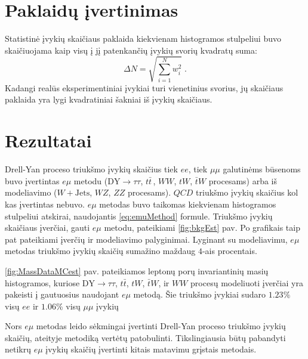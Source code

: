 \documentclass[a4paper, 12pt]{article}
\newcommand{\tbarW}{\bar{t}W}
\newcommand{\ttbar}{t\bar{t}}
\newcommand{\emu}{e\mu}
\newcommand{\mumu}{\mu\mu}
\newcommand{\DYtau}{\mathrm{DY} \! \rightarrow \! \tau\tau}
\newlength\q
\begin{document}
\section{Paklaidų įvertinimas}\label{sec:uncertainties}

Statistinė įvykių skaičiaus paklaida kiekvienam histogramos stulpeliui buvo skaičiuojama kaip visų
į jį patenkančių įvykių svorių kvadratų suma:
\begin{equation}
	\Delta N = \sqrt{\sum_{i=1}^{N}w_{i}^{2}} \; .
	\label{eq:Sumw2Unc}
\end{equation}
Kadangi realūs eksperimentiniai įvykiai turi vienetinius svorius, jų skaičiaus paklaida yra lygi
kvadratiniai šakniai iš įvykių skaičiaus.


\section{Rezultatai}

Drell-Yan proceso triukšmo įvykių skaičius tiek $ee$, tiek $\mumu$ galutinėms būsenoms buvo įvertintas $\emu$
metodu ($\DYtau$, $t\bar{t}\,$, $WW$, $tW$, $\bar{t}W$ procesams) arba iš modeliavimo ($W+\mathrm{Jets}$, $WZ$,
$ZZ$ procesams).
$QCD$ triukšmo įvykių skaičius kol kas įvertintas nebuvo.
$\emu$ metodas buvo taikomas kiekvienam histogramos stulpeliui atskirai, naudojantis \eqref{eq:emuMethod} formule.
Triukšmo įvykių skaičiaus įverčiai, gauti $\emu$ metodu, pateikiami \ref{fig:bkgEst} pav.
Po grafikais taip pat pateikiami įverčių ir modeliavimo palyginimai.
Lyginant su modeliavimu, $\emu$ metodas triukšmo įvykių skaičių sumažino maždaug $4$-ais procentais.

\ref{fig:MassDataMCest} pav. pateikiamos leptonų porų invariantinių masių histogramos, kuriose $\DYtau$, $\ttbar$,
$tW$, $\tbarW$, ir $WW$ procesų modeliuoti įverčiai yra pakeisti į gautuosius naudojant $\emu$ metodą.
Šie triukšmo įvykiai sudaro $1.23\%$ visų $ee$ ir $1.06\%$ visų $\mu\mu$ įvykių

Nors $\emu$ metodas leido sėkmingai įvertinti Drell-Yan proceso triukšmo įvykių skaičių, ateityje metodiką
vertėtų patobulinti.
Tikslingiausia būtų pabandyti netikrų $\emu$ įvykių skaičių įvertinti kitais matavimu grįstais metodais.
\end{document}
